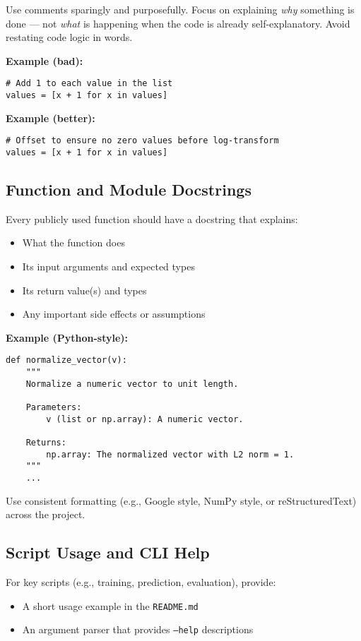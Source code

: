 \documentclass[12pt,openany]{book}
\begin{document}
Use comments sparingly and purposefully. Focus on explaining \emph{why} something is done — not \emph{what} is happening when the code is already self-explanatory. Avoid restating code logic in words.

\textbf{Example (bad):}
\begin{verbatim}
# Add 1 to each value in the list
values = [x + 1 for x in values]
\end{verbatim}

\textbf{Example (better):}
\begin{verbatim}
# Offset to ensure no zero values before log-transform
values = [x + 1 for x in values]
\end{verbatim}

\subsection{Function and Module Docstrings}

Every publicly used function should have a docstring that explains:
\begin{itemize}
    \item What the function does
    \item Its input arguments and expected types
    \item Its return value(s) and types
    \item Any important side effects or assumptions
\end{itemize}

\textbf{Example (Python-style):}
\begin{verbatim}
def normalize_vector(v):
    """
    Normalize a numeric vector to unit length.

    Parameters:
        v (list or np.array): A numeric vector.

    Returns:
        np.array: The normalized vector with L2 norm = 1.
    """
    ...
\end{verbatim}

Use consistent formatting (e.g., Google style, NumPy style, or reStructuredText) across the project.

\subsection{Script Usage and CLI Help}

For key scripts (e.g., training, prediction, evaluation), provide:
\begin{itemize}
    \item A short usage example in the \texttt{README.md}
    \item An argument parser that provides \texttt{--help} descriptions
\end{itemize}
\end{document}
